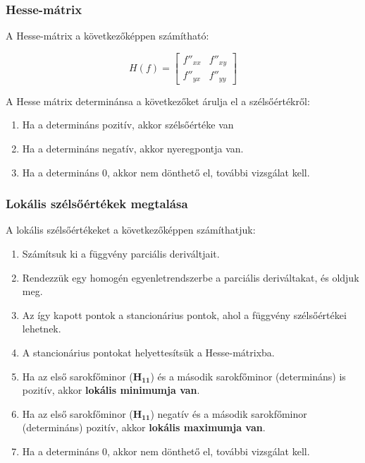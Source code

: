 \documentclass{article}
\begin{document}
\subsubsection{Hesse-mátrix}

A Hesse-mátrix a következőképpen számítható:

\begin{equation*}
    H(f) = \begin{bmatrix} f''_{xx} & f''_{xy} \\ f''_{yx} & f''_{yy} \end{bmatrix}
\end{equation*}

A Hesse mátrix determinánsa a következőket árulja el a szélsőértékről:

\begin{enumerate}
    \item Ha a determináns pozitív, akkor szélsőértéke van
    \item Ha a determináns negatív, akkor nyeregpontja van.
    \item Ha a determináns 0, akkor nem dönthető el, további vizsgálat kell.
\end{enumerate}

\newpage

\subsubsection{Lokális szélsőértékek megtalása}

A lokális szélsőértékeket a következőképpen számíthatjuk:

\begin{enumerate}
    \item Számítsuk ki a függvény parciális deriváltjait.
    \item Rendezzük egy homogén egyenletrendszerbe a parciális deriváltakat, és oldjuk meg.
    \item Az így kapott pontok a stancionárius pontok, ahol a függvény szélsőértékei lehetnek.
    \item A stancionárius pontokat helyettesítsük a Hesse-mátrixba.
    \item Ha az első sarokfőminor ($\mathbf{H_{11}}$) és a második sarokfőminor (determináns) is pozitív, akkor \textbf{lokális minimumja van}.
    \item Ha az első sarokfőminor ($\mathbf{H_{11}}$) negatív és a második sarokfőminor (determináns) pozitív, akkor \textbf{lokális maximumja van}.
    \item Ha a determináns 0, akkor nem dönthető el, további vizsgálat kell.
\end{enumerate}
\end{document}

